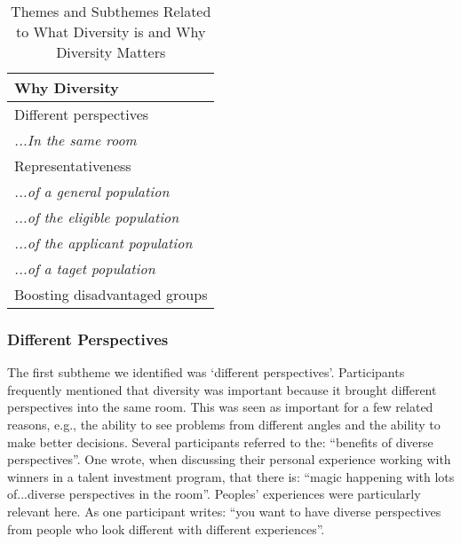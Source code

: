 \begin{table}[h]
    \centering
    \caption{Themes and Subthemes Related to What Diversity is and Why Diversity Matters}
    \label{tab:whydiv}
    \begin{tabular}{|l|} 
        \hline
        \textbf{Why Diversity} \\
        \hline
        Different perspectives \\
        \emph{...In the same room} \\
        Representativeness \\
        \emph{...of a general population} \\
        \emph{...of the eligible population} \\
        \emph{...of the applicant population} \\
        \emph{...of a taget population } \\
        Boosting disadvantaged groups \\
        \hline
    \end{tabular}
\end{table}

\subsubsection{Different Perspectives}
The first subtheme we identified was `different perspectives'. Participants frequently mentioned that diversity was important because it brought different perspectives into the same room. This was seen as important for a few related reasons, e.g., the ability to see problems from different angles and the ability to make better decisions. Several participants referred to the: ``benefits of diverse perspectives''. One wrote, when discussing their personal experience working with winners in a talent investment program, that there is: ``magic happening with lots of...diverse perspectives in the room''. Peoples' experiences were particularly relevant here. As one participant writes: ``you want to have diverse perspectives from people who look different with different experiences''.

